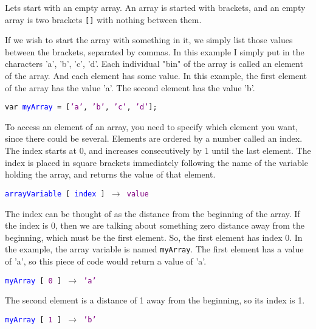 Lets start with an empty array. An array is started with brackets, and an empty array is two brackets \texttt{[]} with nothing between them.


If we wish to start the array with something in it, we simply list those values between the brackets, separated by commas. In this example I simply put in the characters 'a', 'b', 'c', 'd'. Each individual "bin" of the array is called an element of the array. And each element has some value. In this example, the first element of the array has the value 'a'. The second element has the value 'b'.

\begin{center}
	\texttt{\textcolor{OliveGreen}{var} \textcolor{blue}{myArray} =  [\textcolor{purple}{'a'}, \textcolor{purple}{'b'}, \textcolor{purple}{'c'}, \textcolor{purple}{'d'}];}
\end{center}

To access an element of an array, you need to specify which element you want, since there could be several. Elements are ordered by a number called an index. The index starts at 0, and increases consecutively by 1 until the last element. The index is placed in square brackets immediately following the name of the variable holding the array, and returns the value of that element.

\begin{center}
	\texttt{\textcolor{blue}{arrayVariable} [ \textcolor{blue}{index} ] $\rightarrow$ \textcolor{purple}{value}}
\end{center}

The index can be thought of as the distance from the beginning of the array. If the index is 0, then we are talking about something zero distance away from the beginning, which must be the first element. So, the first element has index 0. In the example, the array variable is named \texttt{myArray}. The first element has a value of 'a', so this piece of code would return a value of 'a'.

\begin{center}
	\texttt{\textcolor{blue}{myArray} [ \textcolor{purple}{0} ] $\rightarrow$ \textcolor{purple}{'a'} }
\end{center}

The second element is a distance of 1 away from the beginning, so its index is 1. 

\begin{center}
	\texttt{\textcolor{blue}{myArray} [ \textcolor{purple}{1} ] $\rightarrow$ \textcolor{purple}{'b'}}
\end{center}

